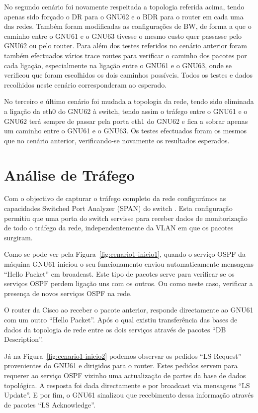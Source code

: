 \documentclass[a4paper,12pt]{article}
\begin{document}
	No segundo cenário foi novamente respeitada a topologia referida acima, tendo apenas sido forçado o DR para o GNU62 e o BDR para o router em cada uma das redes. Também foram modificadas as configurações de BW, de forma a que o caminho entre o GNU61 e o GNU63 tivesse o mesmo custo quer passasse pelo GNU62 ou pelo router. Para além dos testes referidos no cenário anterior foram também efectuados vários trace routes para verificar o caminho dos pacotes por cada ligação, especialmente na ligação entre o GNU61 e o GNU63, onde se verificou que foram escolhidos os dois caminhos possíveis. Todos os testes e dados recolhidos neste cenário corresponderam ao esperado.
				
	No terceiro e último cenário foi mudada a topologia da rede, tendo sido eliminada a ligação da eth0 do GNU62 à switch, tendo assim o tráfego entre o GNU61 e o GNU62 terá sempre de passar pela porta eth1 do GNU62 e fica a sobrar apenas um caminho entre o GNU61 e o GNU63. Os testes efectuados foram os mesmos que no cenário anterior, verificando-se novamente os resultados esperados.

\section{Análise de Tráfego}

	Com o objectivo de capturar o tráfego completo da rede configurámos as capacidades Switched Port Analyzer (SPAN) do switch \cite{website:cisco-span}. Esta configuração permitiu que uma porta do switch servisse para receber dados de monitorização de todo o tráfego da rede, independentemente da VLAN em que os pacotes surgiram.

	Como se pode ver pela Figura~\ref{fig:cenario1-inicio1}, quando o serviço OSPF da máquina GNU61 iniciou o seu funcionamento enviou automaticamente mensagens ``Hello Packet'' em broadcast. Este tipo de pacotes serve para verificar se os serviços OSPF perdem ligação uns com os outros. Ou como neste caso, verificar a presença de novos serviços OSPF na rede. 

	O router da Cisco ao receber o pacote anterior, responde directamente ao GNU61 com um outro ``Hello Packet''. Após o qual existiu transferência das bases de dados da topologia de rede entre os dois serviços através de pacotes ``DB Description''.

	Já na Figura~\ref{fig:cenario1-inicio2} podemos observar os pedidos ``LS Request'' provenientes do GNU61 e dirigidos para o router. Estes pedidos servem para requerer ao serviço OSPF vizinho uma actualização de partes da base de dados topológica. A resposta foi dada directamente e por broadcast via mensagens ``LS Update''. E por fim, o GNU61 sinalizou que recebimento dessa informação através de pacotes ``LS Acknowledge''.
\end{document}
